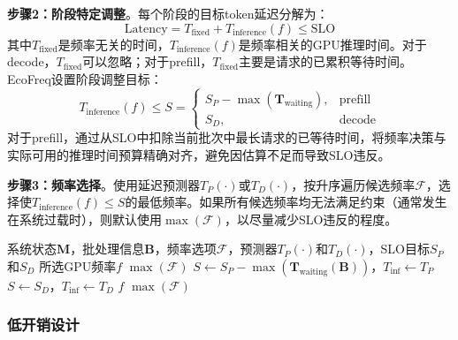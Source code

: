\textbf{步骤2：阶段特定调整}。每个阶段的目标token延迟分解为：
\begin{equation}
    \text{Latency} = T_{\text{fixed}} + T_{\text{inference}}(f) \le \text{SLO}
\end{equation}
其中$T_{\text{fixed}}$是频率无关的时间，$T_{\text{inference}}(f)$是频率相关的GPU推理时间。对于decode，$T_{\text{fixed}}$可以忽略；对于prefill，$T_{\text{fixed}}$主要是请求的已累积等待时间。EcoFreq设置阶段调整目标：
\begin{equation}
    T_{\text{inference}}(f) \le S = \begin{cases}
        S_P - \max\left( \mathbf{T}_{\text{waiting}} \right), & \text{prefill} \\
        S_D, & \text{decode}
    \end{cases}
\end{equation}
对于prefill，通过从SLO中扣除当前批次中最长请求的已等待时间，将频率决策与实际可用的推理时间预算精确对齐，避免因估算不足而导致SLO违反。

\textbf{步骤3：频率选择}。使用延迟预测器$T_P(\cdot)$或$T_D(\cdot)$，按升序遍历候选频率$\mathcal{F}$，选择使$T_{\text{inference}}(f) \le S$的最低频率。如果所有候选频率均无法满足约束（通常发生在系统过载时），则默认使用$\max(\mathcal{F})$，以尽量减少SLO违反的程度。

\begin{algorithm}[!t]
\caption{EcoFreq：SLO感知迭代级频率选择}
\label{alg:ecofreq}
\begin{algorithmic}[1]
    \REQUIRE 系统状态$\mathbf{M}$，批处理信息$\mathbf{B}$，频率选项$\mathcal{F}$，预测器$T_P(\cdot)$和$T_D(\cdot)$，SLO目标$S_P$和$S_D$
    \ENSURE 所选GPU频率$f$
        \RETURN $\max(\mathcal{F})$ \hfill{}
    \ENDIF
        \STATE $S \leftarrow S_P - \max\left(\mathbf{T}_{\text{waiting}}(\mathbf{B})\right)$，$T_{\text{inf}} \leftarrow T_P$
    \ELSE
        \STATE $S \leftarrow S_D$，$T_{\text{inf}} \leftarrow T_D$ \hfill{}
    \ENDIF
            \RETURN $f$ \hfill{}
        \ENDIF
    \ENDFOR
    \RETURN $\max(\mathcal{F})$ \hfill{}
\end{algorithmic}
\end{algorithm}

\subsubsection{低开销设计}

